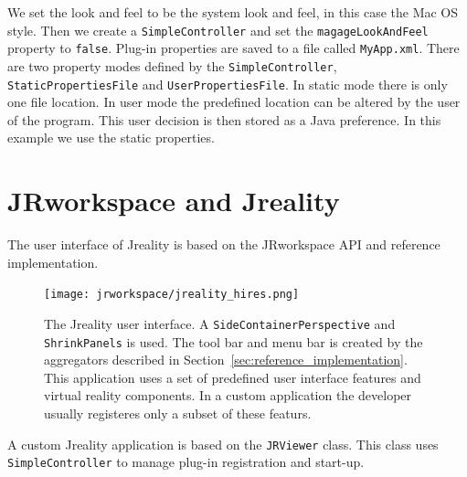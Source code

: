 \documentclass[Thesis.tex]{subfiles}
\begin{document}
We set the look and feel to be the system look and feel, in this case the Mac OS style. Then we create a
{\tt SimpleController} and set the {\tt magageLookAndFeel} property to {\tt false}. Plug-in properties are saved
to a file called {\tt MyApp.xml}. There are two property modes defined by the {\tt SimpleController}, {\tt StaticPropertiesFile}
and {\tt UserPropertiesFile}. In static mode there is only one file location. In user mode the predefined location can
be altered by the user of the program. This user decision is then stored as a {\sc Java} preference. In this example 
we use the static properties.

\section{{\sc JRworkspace} and {\sc Jreality}}

The user interface of {\sc Jreality} \cite{JrealityWebsite} is based on the {\sc JRworkspace} API and reference
implementation.

\begin{figure}[H]
\centering
\texttt{[image: jrworkspace/jreality\_hires.png]}
\caption[The {\sc Jreality} user interface.]{The {\sc Jreality} user interface. A {\tt SideContainerPerspective} 
and {\tt ShrinkPanels} is used. The tool bar and 
menu bar is created by the aggregators described in Section~\ref{sec:reference_implementation}. This application
uses a set of predefined user interface features and virtual reality components. In a custom application the developer 
usually registeres only a subset of these featurs.}
\label{fig:tool_bar_aggregator}
\end{figure}

A custom {\sc Jreality} application is based on the {\tt JRViewer} class. This class uses {\tt SimpleController} to manage
plug-in registration and start-up. 

\subfilebibliography
\end{document}
